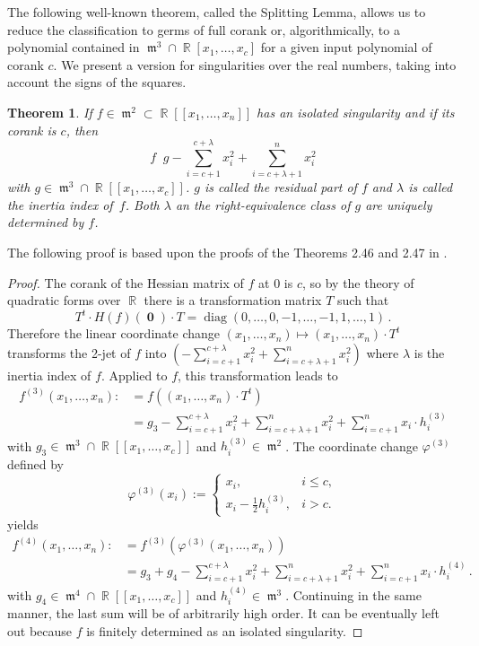 \documentclass[noend]{amsproc}
\newtheorem{theorem}{Theorem}
\theoremstyle{definition}
\DeclareMathOperator{\requiv}{\overset{r}{\sim}}
\DeclareMathOperator{\m}{\mathfrak{m}}
\DeclareMathOperator{\diag}{diag}
\DeclareMathOperator{\R}{\mathbb{R}}
\DeclareMathOperator{\boldzero}{\mathbf{0}}
\begin{document}
The following well-known theorem, called the Splitting Lemma, allows us to
reduce the classification to germs of full corank or, algorithmically, to
a polynomial contained in $\m^3 \cap \R[x_1,\ldots,x_c]$ for a given input
polynomial of corank $c$. We present a version for singularities over the real
numbers, taking into account the signs of the squares.

\begin{theorem}\label{SplittingLemma}
If $f \in \m^2 \subset \R[[x_1,\ldots,x_n]]$ has an isolated singularity and if
its corank is $c$, then
\[
f \requiv g -\sum_{i=c+1}^{c+\lambda} x_i^2 +\sum_{i=c+\lambda+1}^n x_i^2
\]
with $g \in \m^3 \cap \R[[x_1,\ldots,x_c]]$. $g$ is called the residual part of
$f$ and $\lambda$ is called the inertia index of~$f$. Both $\lambda$ an the
right-equivalence class of $g$ are uniquely determined by $f$.
\end{theorem}

The following proof is based upon the proofs of the Theorems 2.46 and 2.47 in
\cite{GLS2007}.

\begin{proof}
The corank of the Hessian matrix of $f$ at $0$ is $c$, so by the theory of
quadratic forms over $\R$ there is a transformation matrix $T$ such that
\[
T^t \cdot H(f)(\boldzero) \cdot T = \diag(0,\ldots,0,-1,\ldots,-1,1,\ldots,1)
\,.
\]
Therefore the linear coordinate change
$(x_1,\ldots,x_n) \mapsto (x_1,\ldots,x_n) \cdot T^t$ transforms the 2-jet of
$f$ into
$\left(-\sum_{i=c+1}^{c+\lambda} x_i^2 +\sum_{i=c+\lambda+1}^n x_i^2\right)$
where $\lambda$ is the inertia index of $f$.
Applied to $f$, this transformation leads to
\begin{align*}
f^{(3)} (x_1,\ldots,x_n)
  :\!&= f((x_1,\ldots,x_n) \cdot T^t) \\
  &= g_3
  -\sum_{i=c+1}^{c+\lambda} x_i^2 +\sum_{i=c+\lambda+1}^n x_i^2
  +\sum_{i=c+1}^n x_i\cdot h_i^{(3)}
\end{align*}
with $g_3 \in \m^3 \cap \R[[x_1,\ldots,x_c]]$ and $h_i^{(3)} \in \m^2$. The
coordinate change $\varphi^{(3)}$ defined by
\[
\varphi^{(3)}(x_i) :=
\begin{cases}
x_i, &i \leq c, \\
x_i-\frac{1}{2}h_i^{(3)}, &i > c.
\end{cases}
\]
yields
\begin{align*}
f^{(4)} (x_1,\ldots,x_n)
  :\!&= f^{(3)}(\varphi^{(3)}(x_1,\ldots,x_n)) \\
  &= g_3 +g_4
  -\sum_{i=c+1}^{c+\lambda} x_i^2 +\sum_{i=c+\lambda+1}^n x_i^2
  +\sum_{i=c+1}^n x_i\cdot h_i^{(4)} \,.
\end{align*}
with $g_4 \in \m^4 \cap \R[[x_1,\ldots,x_c]]$ and $h_i^{(4)} \in \m^3$.
Continuing in the same manner, the last sum will be of arbitrarily high order.
It can be eventually left out because $f$ is finitely determined as an isolated
singularity.
\end{proof}
\end{document}
